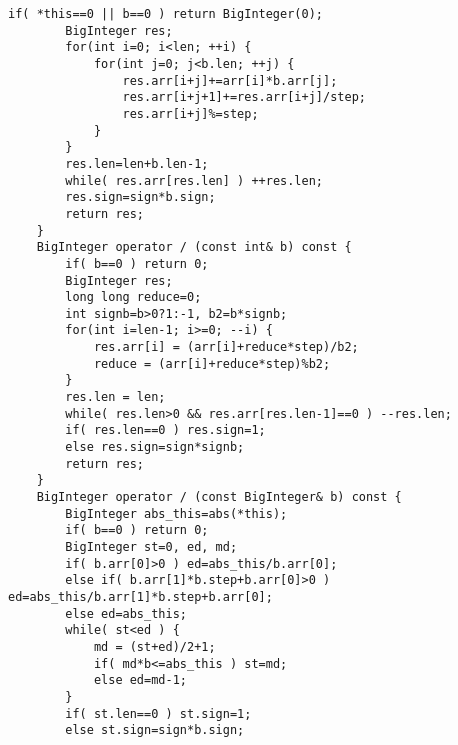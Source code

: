 \documentclass[11pt,twocolumn,a4paper]{article}
\begin{document}
\begin{lstlisting}[label=BigInteger]
		if( *this==0 || b==0 ) return BigInteger(0);
		BigInteger res;
		for(int i=0; i<len; ++i) {
			for(int j=0; j<b.len; ++j) {
				res.arr[i+j]+=arr[i]*b.arr[j];
				res.arr[i+j+1]+=res.arr[i+j]/step;
				res.arr[i+j]%=step;
			}
		}
		res.len=len+b.len-1;
		while( res.arr[res.len] ) ++res.len;
		res.sign=sign*b.sign;
		return res;
	}
	BigInteger operator / (const int& b) const {
		if( b==0 ) return 0;
		BigInteger res;
		long long reduce=0;
		int signb=b>0?1:-1, b2=b*signb;
		for(int i=len-1; i>=0; --i) {
			res.arr[i] = (arr[i]+reduce*step)/b2;
			reduce = (arr[i]+reduce*step)%b2;
		}
		res.len = len;
		while( res.len>0 && res.arr[res.len-1]==0 ) --res.len;
		if( res.len==0 ) res.sign=1;
		else res.sign=sign*signb;
		return res;
	}
	BigInteger operator / (const BigInteger& b) const {
		BigInteger abs_this=abs(*this);
		if( b==0 ) return 0;
		BigInteger st=0, ed, md;
		if( b.arr[0]>0 ) ed=abs_this/b.arr[0];
		else if( b.arr[1]*b.step+b.arr[0]>0 ) ed=abs_this/b.arr[1]*b.step+b.arr[0];
		else ed=abs_this;
		while( st<ed ) {
			md = (st+ed)/2+1;
			if( md*b<=abs_this ) st=md;
			else ed=md-1;
		}
		if( st.len==0 ) st.sign=1;
		else st.sign=sign*b.sign;
		

\end{lstlisting}
\end{document}
